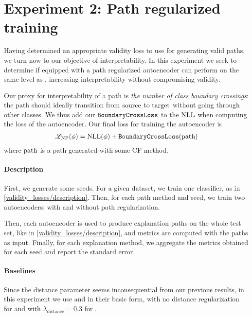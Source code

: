 \documentclass[../main.tex]{subfiles}
\begin{document}
\section{Experiment 2: Path regularized training}
\label{exp/path_reg}

Having determined an appropriate validity loss to use for generating valid paths, we turn now to our objective of interpretability.
In this experiment we seek to determine if \ls{} equipped with a path regularized autoencoder can perform on the same level as \revise{}, increasing interpretability without compromising validity.

Our proxy for interpretability of a path is \emph{the number of class boundary crossings}:
the path should ideally transition from $\mathrm{source}$ to $\mathrm{target}$ without going through other classes.
We thus add our $\mathtt{BoundaryCrossLoss}$ to the $\text{NLL}$ when computing the loss of the autoencoder.
Our final loss for training the autoencoder is
\begin{align*}
    \mathscr{L}_\text{NF}(\phi) = \text{NLL}(\phi) + \mathtt{BoundaryCrossLoss}(\mathrm{path})
\end{align*}
where $\mathrm{path}$ is a path generated with some CF method.


\paragraph{Description}

First, we generate some seeds.
For a given dataset, we train one classifier, as in \autoref{validity_losses/description}.
Then, for each path method and seed, we train two autoencoders: with and without path regularization.

Then, each autoencoder is used to produce explanation paths on the whole test set, like in \autoref{validity_losses/description}, and metrics are computed with the paths as input.
Finally, for each explanation method, we aggregate the metrics obtained for each seed and report the standard error.


\paragraph{Baselines}
\label{exp/path_reg/baselines}

Since the distance parameter seems inconsequential from our previous results,
in this experiment we use \ls{} and \revise{} in their basic form, \ie{} with no distance regularization for \ls{} and with $\lambda_\text{distance} = 0.3$ for \revise.
\end{document}
